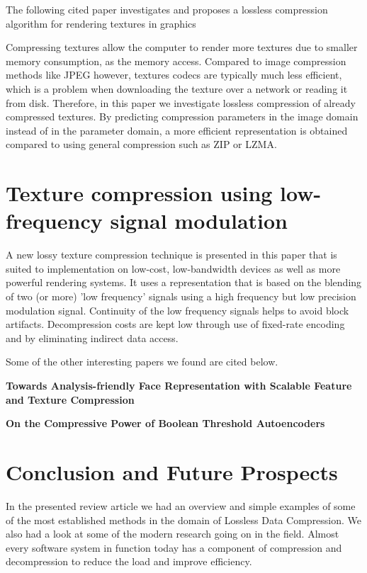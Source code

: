 \documentclass{article}
\begin{document}
The following cited paper investigates and proposes a lossless compression algorithm for rendering textures in graphics

Compressing textures allow the computer to render more textures due to smaller memory consumption, as the memory access. Compared to image compression methods like JPEG however, textures codecs are typically much less efficient, which is a problem when downloading the texture over a network or reading it from disk. Therefore, in this paper we investigate lossless compression of already compressed textures. By predicting compression parameters in the image domain instead of in the parameter domain, a more efficient representation is obtained compared to using general compression such as ZIP or LZMA.

\section{Texture compression using low-frequency signal modulation \cite{10.5555/844174.844187}}

A new lossy texture compression technique is presented in this paper that is suited to implementation on low-cost, low-bandwidth devices as well as more powerful rendering systems. It uses a representation that is based on the blending of two (or more) 'low frequency' signals using a high frequency but low precision modulation signal. Continuity of the low frequency signals helps to avoid block artifacts. Decompression costs are kept low through use of fixed-rate encoding and by eliminating indirect data access.

Some of the other interesting papers we found are cited below.

\textbf{Towards Analysis-friendly Face Representation with Scalable Feature and Texture Compression \cite{wang2020towards}}

\textbf{On the Compressive Power of Boolean Threshold Autoencoders \cite{melkman2020compressive}}

\section{Conclusion and Future Prospects}

In the presented review article we had an overview and simple examples of some of the most established methods in the domain of Lossless Data Compression. We also had a look at some of the modern research going on in the field. Almost every software system in function today has a component of compression and decompression to reduce the load and improve efficiency. 
\end{document}
